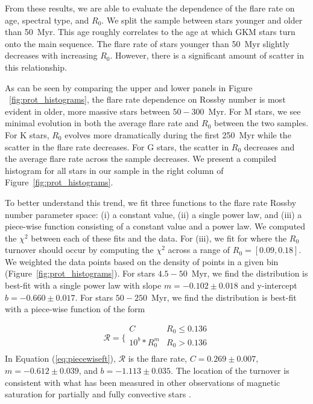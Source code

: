 \documentclass[twocolumn]{aastex631}
\begin{document}
From these results, we are able to evaluate the dependence of the flare rate on age, spectral type,  and $R_0$. We split the sample between stars younger and older than 50~Myr. This age roughly correlates to the age at which GKM stars turn onto the main sequence. The flare rate of stars younger than 50~Myr slightly decreases with increasing $R_0$. However, there is a significant amount of scatter in this relationship.

As can be seen by comparing the upper and  lower panels in Figure ~\ref{fig:prot_histograms}, the flare rate dependence on Rossby number is most evident in older, more massive stars  between $50 - 300$~Myr. For M stars, we see minimal evolution in both the average flare rate and $R_0$ between the two samples. For K stars,  $R_0$ evolves more dramatically during the first 250~Myr while the scatter in the flare rate decreases. For G stars, the scatter in $R_0$ decreases  and the average flare rate across the sample decreases. We present a compiled histogram for all stars in our sample in the right column of Figure~\ref{fig:prot_histograms}.

To better understand this trend, we fit three functions to the flare rate Rossby number parameter space: (i) a constant value, (ii) a single power law, and (iii) a piece-wise function consisting of a constant value and a power law.  We computed the $\chi^2$ between each of these fits and the data. For (iii), we fit for where the $R_0$ turnover should occur by computing the $\chi^2$ across a range of $R_0 = [0.09, 0.18]$. We weighted the data points based on the density of points in a given bin (Figure~\ref{fig:prot_histograms}). For stars $4.5 - 50$~Myr, we find the distribution is best-fit with a single power law with slope $m = -0.102 \pm 0.018$ and y-intercept $b = -0.660 \pm 0.017$. For stars $50 - 250$~Myr, we find the distribution is best-fit with a piece-wise function of the form

\begin{equation}\label{eq:piecewiseft}
  \mathcal{R} =
  \Bigg \{
  \begin{array}{ll}
        C & R_0 \leq 0.136 \\
        10^b * R_0^m  & R_0 > 0.136 \\
  \end{array}
\end{equation}
In Equation (\ref{eq:piecewiseft}), $\mathcal{R}$ is the flare rate, $C = 0.269 \pm 0.007$, $m = -0.612 \pm 0.039$, and $b = -1.113 \pm 0.035$. The location of the turnover is consistent  with what has been measured in other observations of magnetic saturation for partially and fully convective stars \citep[e.g. $L_X/L_\textrm{bol}$; ][]{wright18}.
\end{document}
